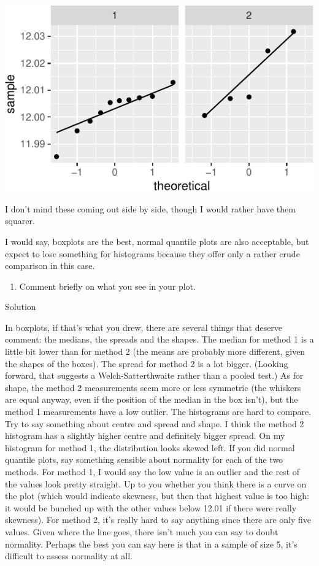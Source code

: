 \documentclass[]{tufte-book}
\providecommand{\tightlist}{%
  \setlength{\itemsep}{0pt}\setlength{\parskip}{0pt}}
\theoremstyle{definition}
\theoremstyle{definition}
\theoremstyle{definition}
\theoremstyle{remark}
\begin{document}
\includegraphics{10-analysis-of-variance_files/figure-latex/unnamed-chunk-54-1}

I don't mind these coming out side by side, though I would rather have
them squarer.

I would say, boxplots are the best, normal quantile plots are also
acceptable, but expect to lose something for histograms because they
offer only a rather crude comparison in this case.

\begin{enumerate}
\def\labelenumi{(\alph{enumi})}
\setcounter{enumi}{4}
\tightlist
\item
  Comment briefly on what you see in your plot.
\end{enumerate}

Solution

In boxplots, if that's what you drew, there are several things that
deserve comment: the medians, the spreads and the shapes. The median for
method 1 is a little bit lower than for method 2 (the means are probably
more different, given the shapes of the boxes). The spread for method 2
is a lot bigger. (Looking forward, that suggests a Welch-Satterthwaite
rather than a pooled test.) As for shape, the method 2 measurements seem
more or less symmetric (the whiskers are equal anyway, even if the
position of the median in the box isn't), but the method 1 measurements
have a low outlier. The histograms are hard to compare. Try to say
something about centre and spread and shape. I think the method 2
histogram has a slightly higher centre and definitely bigger spread. On
my histogram for method 1, the distribution looks skewed left. If you
did normal quantile plots, say something sensible about normality for
each of the two methods. For method 1, I would say the low value is an
outlier and the rest of the values look pretty straight. Up to you
whether you think there is a curve on the plot (which would indicate
skewness, but then that highest value is too high: it would be bunched
up with the other values below 12.01 if there were really skewness). For
method 2, it's really hard to say anything since there are only five
values. Given where the line goes, there isn't much you can say to doubt
normality. Perhaps the best you can say here is that in a sample of size
5, it's difficult to assess normality at all.
\end{document}
